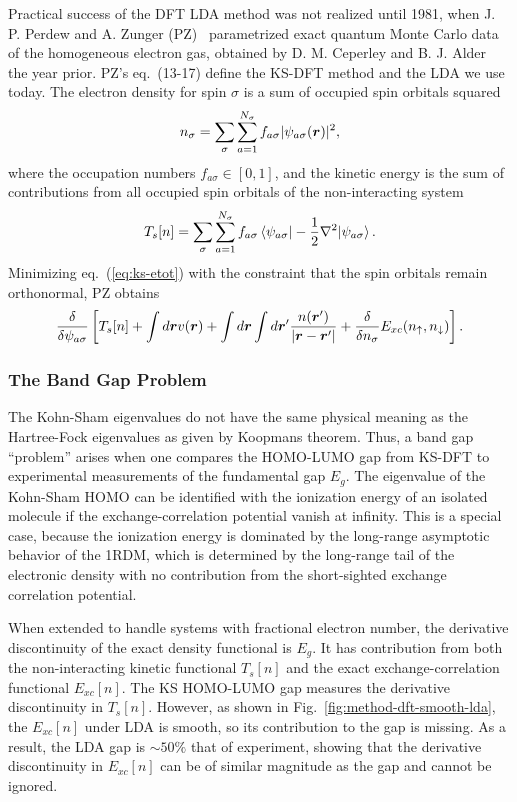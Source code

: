Practical success of the DFT LDA method was not realized until 1981, when J. P. Perdew and A. Zunger (PZ)~\cite{Perdew1981} parametrized exact quantum Monte Carlo data of the homogeneous electron gas, obtained by D. M. Ceperley and B. J. Alder~\cite{Ceperley1980} the year prior. PZ's eq.~(13-17) define the KS-DFT method and the LDA we use today. The electron density for spin $\sigma$ is a sum of occupied spin orbitals squared
\begin{align}
n_{\sigma} = \sum\limits_{\sigma}\sum\limits_{a=1}^{N_{\sigma}}
f_{a\sigma} \vert\psi_{a\sigma}(\boldsymbol{r})\vert^2,
\end{align}
where the occupation numbers $f_{a\sigma}\in[0, 1]$, and the kinetic energy is the sum of contributions from all occupied spin orbitals of the non-interacting system
\begin{align}
T_s[n] = \sum\limits_\sigma\sum\limits_{a=1}^{N_{\sigma}}
f_{a\sigma} \braket{\psi_{a\sigma}|-\frac{1}{2}\nabla^2|\psi_{a\sigma}}.
\end{align}
Minimizing eq.~(\ref{eq:ks-etot}) with the constraint that the spin orbitals remain orthonormal, PZ obtains
\begin{align}
\dfrac{\delta}{\delta\psi_{a\sigma}} \left[
T_s[n] + \int d\boldsymbol{r}v(\boldsymbol{r}) + \int d\boldsymbol{r}\int d\boldsymbol{r}' \dfrac{n(\boldsymbol{r}')}{\vert\boldsymbol{r}-\boldsymbol{r}'\vert} +
\dfrac{\delta}{\delta n_{\sigma}} E_{xc}(n_{\uparrow},n_{\downarrow})
\right].
\end{align}

\subsubsection{The Band Gap Problem} \label{sec:method-dft-bandgap}
The Kohn-Sham eigenvalues do not have the same physical meaning as the Hartree-Fock eigenvalues as given by Koopmans theorem. Thus, a band gap ``problem'' arises when one compares the HOMO-LUMO gap from KS-DFT to experimental measurements of the fundamental gap $E_g$. The eigenvalue of the Kohn-Sham HOMO can be identified with the ionization energy of an isolated molecule if the exchange-correlation potential vanish at infinity.
This is a special case, because the ionization energy is dominated by the long-range asymptotic behavior of the 1RDM, which is determined by the long-range tail of the electronic density with no contribution from the short-sighted exchange correlation potential.

When extended to handle systems with fractional electron number, the derivative discontinuity of the exact density functional is $E_g$. It has contribution from both the non-interacting kinetic functional $T_s[n]$ and the exact exchange-correlation functional $E_{xc}[n]$. The KS HOMO-LUMO gap measures the derivative discontinuity in $T_s[n]$. However, as shown in Fig.~\ref{fig:method-dft-smooth-lda}, the $E_{xc}[n]$ under LDA is smooth, so its contribution to the gap is missing. As a result, the LDA gap is $\sim 50\%$ that of experiment, showing that the derivative discontinuity in $E_{xc}[n]$ can be of similar magnitude as the gap and cannot be ignored.

